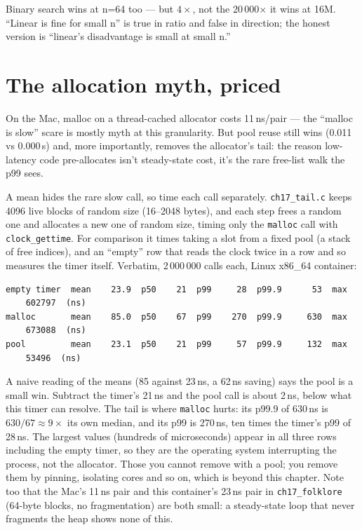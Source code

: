 Binary search wins at n=64 too --- but $4\times$, not the
20\,000$\times$ it wins at 16M. ``Linear is fine for small n'' is
true in ratio and false in direction; the honest version is
``linear's disadvantage is small at small n.''

\section{The allocation myth, priced}
On the Mac, malloc on a thread-cached allocator costs 11\,ns/pair --- the
``malloc is slow'' scare is mostly myth at this granularity. But
pool reuse still wins (0.011 vs 0.000\,\textmu s) and, more
importantly, removes the allocator's tail: the reason low-latency
code pre-allocates isn't steady-state cost, it's the rare
free-list walk the p99 sees.



\begin{example}
A mean hides the rare slow call, so time each call separately.
\texttt{ch17\_tail.c} keeps 4096 live blocks of random size
(16--2048 bytes), and each step frees a random one and allocates a new
one of random size, timing only the \texttt{malloc} call with
\texttt{clock\_gettime}. For comparison it times taking a slot from a
fixed pool (a stack of free indices), and an ``empty'' row that reads
the clock twice in a row and so measures the timer itself. Verbatim,
2\,000\,000 calls each, Linux x86\_64 container:

{\scriptsize
\begin{verbatim}
empty timer  mean    23.9  p50    21  p99     28  p99.9      53  max
    602797  (ns)
malloc       mean    85.0  p50    67  p99    270  p99.9     630  max
    673088  (ns)
pool         mean    23.1  p50    21  p99     57  p99.9     132  max
    53496  (ns)
\end{verbatim}
}
A naive reading of the means (85 against 23\,ns, a 62\,ns saving) says
the pool is a small win. Subtract the timer's 21\,ns and the pool call
is about 2\,ns, below what this timer can resolve. The tail is where
\texttt{malloc} hurts: its p99.9 of 630\,ns is $630/67\approx 9\times$
its own median, and its p99 is 270\,ns, ten times the timer's p99
of 28\,ns. The largest values (hundreds of microseconds) appear in all
three rows including the empty timer, so they are the operating
system interrupting the process, not the allocator. Those you
cannot remove with a pool; you remove them by pinning, isolating
cores and so on, which is beyond this chapter. Note too that the
Mac's 11\,ns pair and this container's 23\,ns pair in
\texttt{ch17\_folklore} (64-byte blocks, no fragmentation) are both small: a
steady-state loop that never fragments the heap shows none of this.
\end{example}



